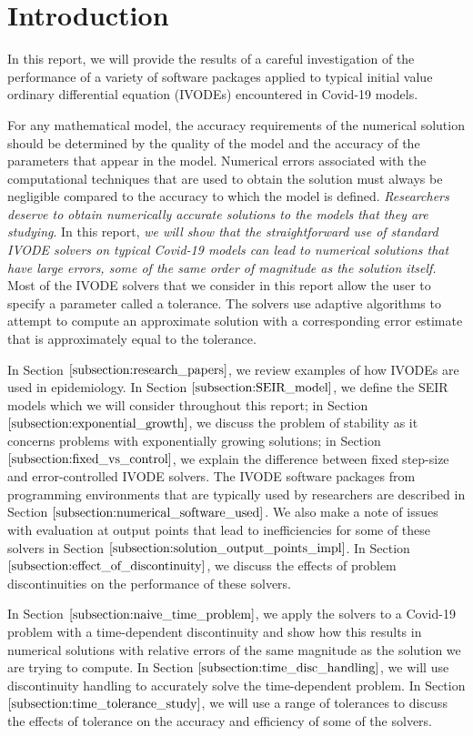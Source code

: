 \section{Introduction}
\label{section:intro}
In this report, we will provide the results of a careful investigation of the performance of a variety of software packages applied to typical initial value ordinary differential equation (IVODEs) encountered in Covid-19 models. 

For any mathematical model, the accuracy requirements of the numerical solution should be determined by the quality of the model and the accuracy of the parameters that appear in the model. Numerical errors associated with the computational techniques that are used to obtain the solution must always be negligible compared to the accuracy to which the model is defined. \emph{Researchers deserve to obtain numerically accurate solutions to the models that they are studying}. In this report, \emph{we will show that the straightforward use of standard IVODE solvers on typical Covid-19 models can lead to numerical solutions that have large errors, some of the same order of magnitude as the solution itself.} Most of the IVODE solvers that we consider in this report allow the user to specify a parameter called a tolerance. The solvers use adaptive algorithms to attempt to compute an approximate solution with a corresponding error estimate that is approximately equal to the tolerance.

In Section $\ref{subsection:research_papers}$, we review examples of how IVODEs are used in epidemiology. In Section $\ref{subsection:SEIR_model}$, we define the SEIR models which we will consider throughout this report; in Section $\ref{subsection:exponential_growth}$, we discuss the problem of stability as it concerns problems with exponentially growing solutions; in Section $\ref{subsection:fixed_vs_control}$, we explain the difference between fixed step-size and error-controlled IVODE solvers. The IVODE software packages from programming environments that are typically used by researchers are described in Section $\ref{subsection:numerical_software_used}$. We also make a note of issues with evaluation at output points that lead to inefficiencies for some of these solvers in Section $\ref{subsection:solution_output_points_impl}$. In Section $\ref{subsection:effect_of_discontinuity}$, we discuss the effects of problem discontinuities on the performance of these solvers.

In Section $\ref{subsection:naive_time_problem}$, we apply the solvers to a Covid-19 problem with a time-dependent discontinuity and show how this results in numerical solutions with relative errors of the same magnitude as the solution we are trying to compute. In Section $\ref{subsection:time_disc_handling}$, we will use discontinuity handling to accurately solve the time-dependent problem. In Section $\ref{subsection:time_tolerance_study}$, we will use a range of tolerances to discuss the effects of tolerance on the accuracy and efficiency of some of the solvers.

